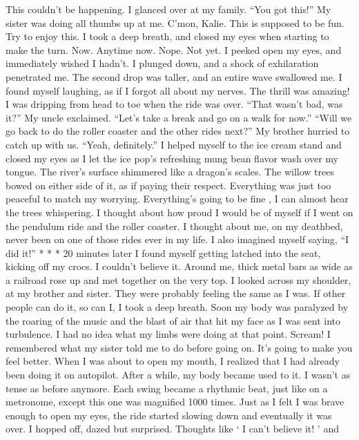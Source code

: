 \documentclass[12pt]{article}
\begin{document}
 This couldn’t be happening. 
 I glanced over at my family.  “You got this!” My sister was doing all thumbs up at me. 
 C’mon, Kalie. This is supposed to be fun. Try to enjoy this.  I took a deep breath, and  closed my eyes when starting to make the turn. 
 Now.  Anytime now.  Nope. Not yet. 
 I peeked open my eyes, and immediately wished I hadn’t. I plunged down, and  a shock of  exhilaration penetrated me.  The second drop was taller,  and an entire wave swallowed me.  I  found myself laughing, as if I forgot all about my nerves. The thrill was amazing!  I was dripping from head to toe when the ride was over. 
 “That wasn’t bad, was it?” My uncle exclaimed. “Let’s take a break and go on a walk for  now.”  “Will we go back to do the roller coaster and the other rides next?” My brother hurried to  catch up with us.  “Yeah, definitely.”  I helped myself to the ice cream stand and closed my eyes as I let the ice pop’s refreshing  mung bean flavor wash over my tongue. The river’s surface shimmered like a dragon’s scales.  The willow trees bowed on either side of it, as if paying their respect. Everything was just too  peaceful to match my worrying. 
 Everything’s going to be  fine  ,  I can almost hear the  trees whispering.  I thought about how proud I would be of myself if I went on the pendulum ride and the  roller coaster. I thought about me, on my deathbed, never been on one of those rides ever in my  life.  I also imagined myself saying,  “I did it!” 
 *   *   *  20 minutes later I found myself getting latched into the seat, kicking off my crocs. I  couldn’t believe it. Around me, thick metal bars as wide as a railroad rose up and met together on  the very top. I looked across my shoulder, at my brother and sister. They were probably feeling  the same as I was. 
 If other people can do it, so can I,  I took a deep  breath.  Soon my body was paralyzed by the roaring of the music and the blast of air that hit my  face as I was sent into turbulence. I had no idea what my limbs were doing at that point. 
 Scream!  I remembered what my sister told me to do before going on.  It’s going to make  you feel better. 
 When I was about to open my mouth, I realized that I had already been doing it on  autopilot. After a while, my body became used to it. I wasn’t as tense as before anymore. Each  swing became a rhythmic beat, just like on a metronome, except this one was magnified 1000  times. Just as I felt I was brave enough to open my eyes, the ride started slowing down and  eventually it was over.  I hopped off, dazed but surprised.  Thoughts like ‘  I can’t believe it!  ’ and 
\end{document}
